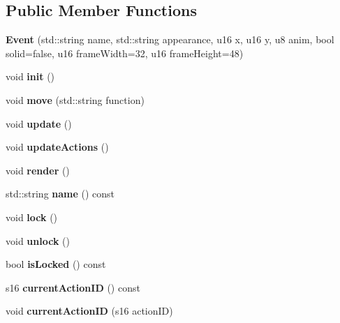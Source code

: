 \subsection*{Public Member Functions}
\begin{DoxyCompactItemize}
\item 
\hypertarget{classEvent_af58b43ba8ac202d1ccf3b3f58f33584f}{{\bfseries Event} (std\-::string name, std\-::string appearance, u16 x, u16 y, u8 anim, bool solid=false, u16 frame\-Width=32, u16 frame\-Height=48)}\label{classEvent_af58b43ba8ac202d1ccf3b3f58f33584f}

\item 
\hypertarget{classEvent_a3390735112fadefd4e8850d329471409}{void {\bfseries init} ()}\label{classEvent_a3390735112fadefd4e8850d329471409}

\item 
\hypertarget{classEvent_a844145f6435917f3f37a20c60667441e}{void {\bfseries move} (std\-::string function)}\label{classEvent_a844145f6435917f3f37a20c60667441e}

\item 
\hypertarget{classEvent_a104089a099a45971f10fdf7eaf5654f4}{void {\bfseries update} ()}\label{classEvent_a104089a099a45971f10fdf7eaf5654f4}

\item 
\hypertarget{classEvent_a9ee6473e5e6ccbea302d3f03d1148afd}{void {\bfseries update\-Actions} ()}\label{classEvent_a9ee6473e5e6ccbea302d3f03d1148afd}

\item 
\hypertarget{classEvent_a629a990e09f5ba2b676df218fdb32bf6}{void {\bfseries render} ()}\label{classEvent_a629a990e09f5ba2b676df218fdb32bf6}

\item 
\hypertarget{classEvent_a54b3c3839330abcd2ca796af2565454c}{std\-::string {\bfseries name} () const }\label{classEvent_a54b3c3839330abcd2ca796af2565454c}

\item 
\hypertarget{classEvent_a77ff8a15cc8cdf700a7c86bc680f45aa}{void {\bfseries lock} ()}\label{classEvent_a77ff8a15cc8cdf700a7c86bc680f45aa}

\item 
\hypertarget{classEvent_a3e976db9b1916fb6c64273c4741c76c7}{void {\bfseries unlock} ()}\label{classEvent_a3e976db9b1916fb6c64273c4741c76c7}

\item 
\hypertarget{classEvent_ad8852d64fd863e05c1203a9f94c826ca}{bool {\bfseries is\-Locked} () const }\label{classEvent_ad8852d64fd863e05c1203a9f94c826ca}

\item 
\hypertarget{classEvent_a4a016df82b18e1cfd9d7ab1e0300e51a}{s16 {\bfseries current\-Action\-I\-D} () const }\label{classEvent_a4a016df82b18e1cfd9d7ab1e0300e51a}

\item 
\hypertarget{classEvent_ae428afbb7d64cadd3e3176db9b953646}{void {\bfseries current\-Action\-I\-D} (s16 action\-I\-D)}\label{classEvent_ae428afbb7d64cadd3e3176db9b953646}

\end{DoxyCompactItemize}
